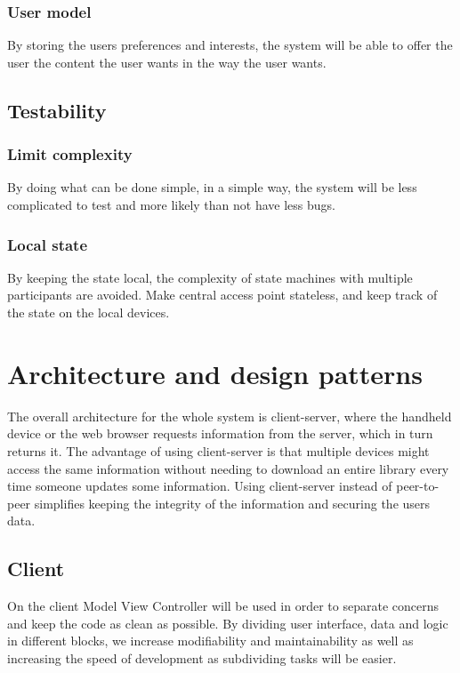 \documentclass[11pt]{book}
\begin{document}
\subsubsection{User model}
By storing the users preferences and interests, the system will be able to offer the user the content the user wants in the way the user wants.

\subsection{Testability}

\subsubsection{Limit complexity}
By doing what can be done simple, in a simple way, the system will be less complicated to test and more likely than not have less bugs.

\subsubsection{Local state}
By keeping the state local, the complexity of state machines with multiple participants are avoided. Make central access point stateless, and keep track of the state on the local devices.

\section{Architecture and design patterns}

The overall architecture for the whole system is client-server, where the handheld device or the web browser requests information from the server, which in turn returns it. The advantage of using client-server is that multiple devices might access the same information without needing to download an entire library every time someone updates some information. Using client-server instead of peer-to-peer simplifies keeping the integrity of the information and securing the users data.

\subsection{Client}
On the client Model View Controller will be used in order to separate concerns and keep the code as clean as possible. By dividing user interface, data and logic in different blocks, we increase modifiability and maintainability as well as increasing the speed of development as subdividing tasks will be easier.
\end{document}
